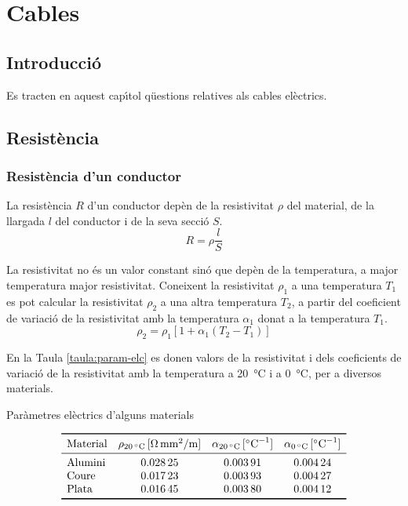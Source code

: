 \chapter{Cables}

\section{Introducci\'{o}}
Es tracten en aquest cap\'{\i}tol q\"{u}estions relatives als cables el\`{e}ctrics.

\section{Resist\`{e}ncia}

\subsection{Resist\`{e}ncia d'un conductor}

La resist\`{e}ncia $R$ d'un conductor dep\`{e}n de la resistivitat $\rho$
del material, de la llargada $l$ del conductor i de la seva secci\'{o}
$S$.
\begin{equation}
   R= \rho \frac{l}{S}
\end{equation}
\index{$\rho$}

La resistivitat no
\'{e}s un valor constant sin\'{o} que dep\`{e}n de la temperatura, a major
temperatura major resistivitat. Coneixent la resistivitat $\rho_1$ a una
temperatura $T_1$ es pot calcular la resistivitat $\rho_2$ a una altra
temperatura $T_2$, a partir del coeficient de variaci\'{o} de la
resistivitat amb la temperatura $\alpha_1$ donat a la temperatura $T_1$.
\begin{equation}
   \rho_2 = \rho_1 [1 + \alpha_1 (T_2 - T_1)]\label{eq:resistivitat}
\end{equation}
\index{$\alpha$}

En la Taula
\vref{taula:param-elc} es donen valors de la resistivitat i dels
coeficients de variaci\'{o} de la resistivitat amb la temperatura a
\SI{20}{\celsius} i a \SI{0}{\celsius}, per a diversos materials.
\begin{table}[htb]
   \caption{\label{taula:param-elc} Par\`{a}metres el\`{e}ctrics d'alguns materials}
   \[ \begin{array}{lccc}
   \toprule[1pt]
   \text{Material} & \rho_{\SI{20}{\celsius}}\,[\si{\ohm.mm^2/m}] & \alpha_{\SI{20}{\celsius}}\,[\si{\celsius^{-1}}] &
   \alpha_{\SI{0}{\celsius}}\,[\si{\celsius^{-1}}]
   \\
   \midrule
      \text{Alumini} & \num{0,02825} & \num{0,00391} & \num{0,00424} \\
      \text{Coure}   & \num{0,01723} & \num{0,00393} & \num{0,00427} \\
      \text{Plata}   & \num{0,01645} & \num{0,00380} & \num{0,00412} \\
   \bottomrule[1pt]
   \end{array}   \]
\end{table}

